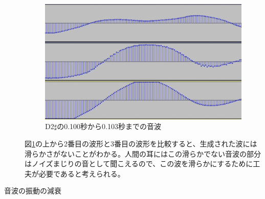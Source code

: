 \begin{description}
\begin{figure}[t]
\begin{center}
\includegraphics[width=0.7\hsize]{figure/88_88_det/d2s_0100_0103.png}
\caption{D2$\sharp$の0.100秒から0.103秒までの音波}
\label{fig:88_88_smooth}
\end{center}
\end{figure}

図\ref{fig:88_88_smooth}の上から2番目の波形と3番目の波形を比較すると、生成された波には滑らかさがないことがわかる。人間の耳にはこの滑らかでない音波の部分はノイズまじりの音として聞こえるので、この波を滑らかにするために工夫が必要であると考えられる。

\item[音波の振動の減衰]\mbox{}


\end{description}
